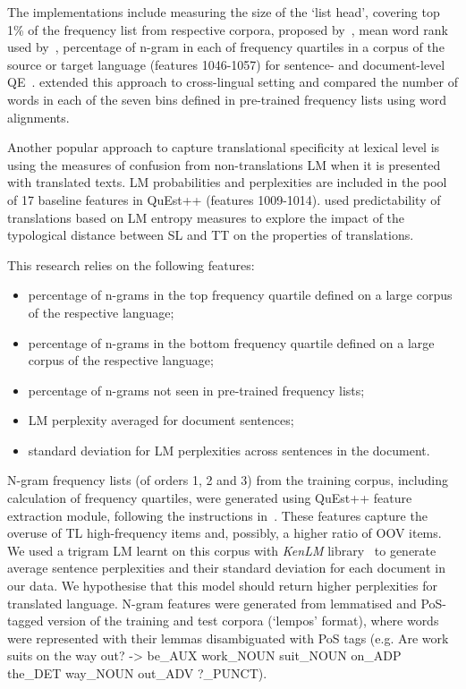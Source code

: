 The implementations include measuring the size of the `list head', covering top 1\% of the frequency list from respective corpora, proposed by~\citet{Laviosa1998}, mean word rank used by~\citet{Volansky2015}, percentage of n-gram in each of frequency quartiles in a corpus of the source or target language (features 1046-1057) for sentence- and document-level \gls{QE}~\cite{Scarton2016}. \citet{Sominsky2019} extended this approach to cross-lingual setting and compared the number of words in each of the seven bins defined in pre-trained frequency lists using word alignments.

Another popular approach to capture translational specificity at lexical level is using the measures of confusion from non-translations \gls{LM} when it is presented with translated texts. \gls{LM} probabilities and perplexities are included in the pool of 17 baseline features in QuEst++ (features 1009-1014).
\cite{Nikolaev2020} used predictability of translations based on LM entropy measures to explore the impact of the typological distance between SL and TT on the properties of translations. 

\label{pg:ngrams}
This research relies on the following features:
\begin{itemize}\compresslist{}
	\item percentage of n-grams in the top frequency quartile defined on a large corpus of the respective language;
	\item percentage of n-grams in the bottom frequency quartile defined on a large corpus of the respective language;
	\item percentage of n-grams not seen in pre-trained frequency lists;
	\item LM perplexity averaged for document sentences;
	\item standard deviation for LM perplexities across sentences in the document. 
\end{itemize}

N-gram frequency lists (of orders 1, 2 and 3) from the training corpus, including calculation of frequency quartiles, were generated using QuEst++ feature extraction module, following the instructions in~\citet{Specia2016}.
These features capture the overuse of TL high-frequency items and, possibly, a higher ratio of OOV items. 
We used a trigram LM learnt on this corpus with \textit{KenLM} library~\cite{Heafield2011} to generate average sentence perplexities and their standard deviation for each document in our data. We hypothesise that this model should return higher perplexities for translated language. 
N-gram features were generated from lemmatised and PoS-tagged version of the training and test corpora  (`lempos' format), where words were represented with their lemmas disambiguated with PoS tags (e.g. Are work suits on the way out? -> be\_AUX work\_NOUN suit\_NOUN on\_ADP the\_DET way\_NOUN out\_ADV ?\_PUNCT).

